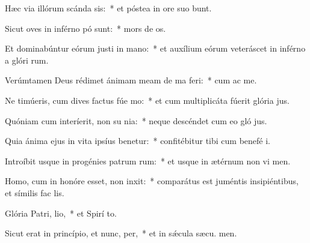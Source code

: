 \item Hæc via illórum scánda sis:~* et póstea in ore suo bunt.
\item Sicut oves in inférno pó sunt:~* mors de os.
\item Et dominabúntur eórum justi in mano:~* et auxílium eórum veteráscet in inférno a glóri rum.
\item Verúmtamen Deus rédimet ánimam meam de ma feri:~* cum ac me.
\item Ne timúeris, cum dives factus fúe mo:~* et cum multiplicáta fúerit glória  jus.
\item Quóniam cum interíerit, non su nia:~* neque descéndet cum eo gló jus.
\item Quia ánima ejus in vita ipsíus benetur:~* confitébitur tibi cum benefé i.
\item Introíbit usque in progénies patrum rum:~* et usque in ætérnum non vi men.
\item Homo, cum in honóre esset, non inxit:~* comparátus est juméntis insipiéntibus, et símilis fac  lis.
\item Glória Patri,  lio,~* et Spirí to.
\item Sicut erat in princípio, et nunc,  per,~* et in sǽcula sæcu. men.
